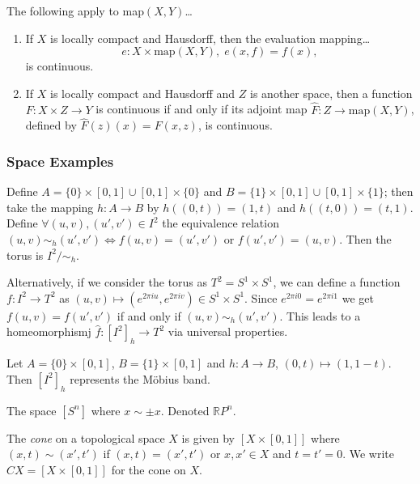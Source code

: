 \begin{theorem}
The following apply to map$(X,Y)$\dots
\begin{enumerate}
  \item If $X$ is locally compact and Hausdorff, then the evaluation mapping\dots
  $$e: X \times \textrm{map}(X,Y), \; e(x,f) = f(x),$$
  is continuous.
  \item If $X$ is locally compact and Hausdorff and $Z$ is another space, then a function $F : X \times Z \rightarrow Y$ is continuous if and only if its
  adjoint map $\hat{F} : Z \rightarrow \textrm{map}(X,Y)$, defined by $\hat{F}(z)(x) = F(x,z)$, is continuous.
\end{enumerate}
\end{theorem}

\subsubsection{Space Examples}\label{examplespaces}

\label{torus}
Define $A = \{ 0 \} \times [0,1] \cup [0,1] \times \{ 0 \}$ and $B = \{ 1 \} \times [0,1] \cup [0,1] \times \{ 1 \}$; then take the mapping
$h : A \rightarrow B$ by $h((0,t)) = (1,t)$ and $h((t,0)) = (t,1)$. Define $\forall (u,v),(u',v') \in I^2$ the equivalence relation
$(u,v) \sim_h (u',v') \Leftrightarrow f(u,v) = (u',v') \textrm { or } f(u',v') = (u,v).$ Then the torus is $I^2 / \sim_h$. \newline

\noindent Alternatively, if we consider the torus as $T^2 = S^1 \times S^1$, we can define a function $f : I^2 \rightarrow T^2$ as
$(u,v) \mapsto (e^{2 \pi i u}, e^{2 \pi i v}) \in S^1 \times S^1$. Since $e^{2 \pi i 0} = e^{2 \pi i 1}$ we get $f(u,v) = f(u',v')$ if and only
if $(u,v) \sim_h (u',v')$. This leads to a homeomorphismj $\hat{f} : [I^2]_h \rightarrow T^2$ via universal properties.

\label{mobiusstrip}
Let $A = \{ 0 \} \times [0,1]$, $B = \{ 1 \} \times [0,1]$ and $h : A \rightarrow B$, $(0,t) \mapsto (1,1-t)$. Then $[I^2]_h$ represents the M\"obius band.

\label{projectivespace}
The space $[S^n]$ where $x \sim \pm x$. Denoted $\mathbb{R}P^n$.

\label{cone}
The \emph{cone} on a topological space $X$ is given by $[X \times [0,1]]$ where $(x,t) \sim (x',t')$ if $(x,t) = (x',t')$ or
$x,x' \in X$ and $t = t' = 0$. We write $CX = [X \times [0,1]]$ for the cone on $X$.

